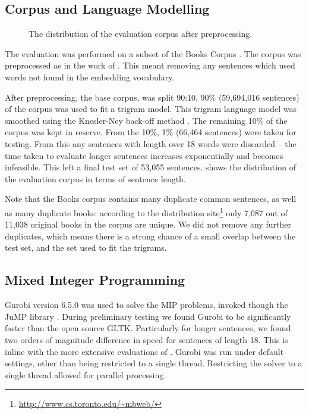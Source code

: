 {\subsection{Corpus and Language Modelling}
\begin{figure}
	\caption{\label{fig:corpus} The distribution of the evaluation corpus after preprocessing.}
\end{figure}

The evaluation was performed on a subset of the Books Corpus \parencite{moviebook}. The corpus was preprocessed as in the work of \textcite{White2015BOWgen}. This meant removing any sentences which used words not found in the embedding vocabulary.

After preprocessing, the base corpus, was split 90:10. 90\% (59,694,016 sentences) of the corpus was used to fit a trigram model. This trigram language model was smoothed using the Knesler-Ney back-off method \parencite{kneser1995improved}. The remaining 10\% of the corpus was kept in reserve. From the 10\%, 1\% (66,464 sentences) were taken for testing. From this any sentences with length over 18 words were discarded -- the time taken to evaluate longer sentences increases exponentially and becomes infeasible. This left a final test set of 53,055 sentences.  shows the distribution of the evaluation corpus in terms of sentence length.
 
Note that the Books corpus contains many duplicate common sentences, as well as many duplicate books: according to the distribution site\footnote{\url{http://www.cs.toronto.edu/~mbweb/}} only 7,087 out of 11,038 original books in the corpus are unique. We did not remove any further duplicates, which means there is a strong chance of a small overlap between the test set, and the set used to fit the trigrams.
 

\subsection{Mixed Integer Programming}
Gurobi version 6.5.0 was used to solve the MIP problems, invoked though the JuMP library \parencite{jump}. During preliminary testing we found Gurobi to be significantly faster than the open source GLTK. Particularly for longer sentences, we found two orders of magnitude difference in speed for sentences of length 18. This is inline with the more extensive evaluations of \textcite{meindl2012analysis}. Gurobi was run under default settings, other than being restricted to a single thread. Restricting the solver to a single thread allowed for parallel processing.

}
